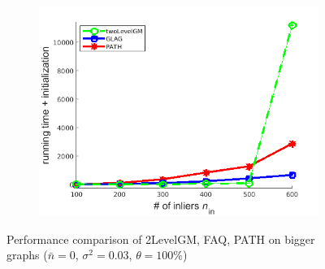 \begin{figure}[h]
\begin{subfigure}[b]{0.32\textwidth}
			\includegraphics[scale=0.25]{"chapter3/fig/SyntheticTest_BigGraphs/descr/Results_v4.3.3/Test2/time_summary_avg1t"} 
		\end{subfigure} 	
	\caption[Performance comparison of 2LevelGM, FAQ, PATH on bigger graphs: test $2$]{Performance comparison of 2LevelGM, FAQ, PATH on bigger graphs ($\bar{n}=0$, $\sigma^2=0.03$, $\theta=100\%$)}
	\label{fig:synTest2_bigGraphs_ver433}
\end{figure}
